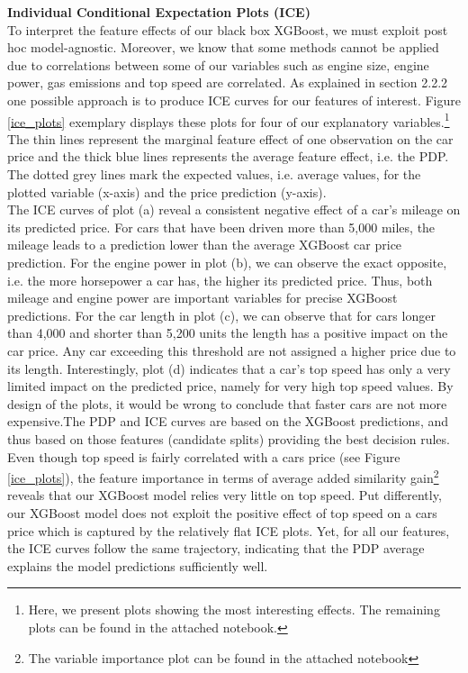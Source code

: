 \documentclass[12pt]{article}
\begin{document}
\noindent \textbf{Individual Conditional Expectation Plots (ICE)} \\
To interpret the feature effects of our black box XGBoost, we must exploit post hoc model-agnostic. Moreover, we know that some methods cannot be applied due to correlations between some of our variables such as engine size, engine power, gas emissions and top speed are correlated. As explained in section 2.2.2 one possible approach is to produce ICE curves for our features of interest. Figure \ref{ice_plots} exemplary displays these plots for four of our explanatory variables.\footnote{Here, we present plots showing the most interesting effects. The remaining plots can be found in the attached notebook.} The thin lines represent the marginal feature effect of one observation on the car price and the thick blue lines represents the average feature effect, i.e. the PDP. The dotted grey lines mark the expected values, i.e.  average values, for the plotted variable (x-axis) and the price prediction (y-axis).\\

\noindent The ICE curves of plot (a) reveal a consistent negative effect of a car's mileage on its predicted price. For cars that have been driven more than 5,000 miles, the mileage leads to a prediction lower than the average XGBoost car price prediction. For the engine power in plot (b), we can observe the exact opposite, i.e. the more horsepower a car has, the higher its predicted price. Thus, both mileage and engine power are important variables for precise XGBoost predictions. For the car length in plot (c), we can observe that for cars longer than 4,000 and shorter than 5,200 units the length has a positive impact on the car price. Any car exceeding this threshold are not assigned a higher price due to its length. Interestingly, plot (d) indicates that a car's top speed has only a very limited impact on the predicted price, namely for very high top speed values. By design of the plots, it would be wrong to conclude that faster cars are not more expensive.The PDP and ICE curves are based on the XGBoost predictions, and thus based on those features (candidate splits) providing the best decision rules. Even though top speed is fairly correlated with a cars price (see Figure \ref{ice_plots}), the feature importance in terms of average added similarity gain\footnote{The variable importance plot can be found in the attached notebook} reveals that our XGBoost model relies very little on top speed. Put differently, our XGBoost model does not exploit the positive effect of top speed on a cars price which is captured by the relatively flat ICE plots. Yet, for all our features, the ICE curves follow the same trajectory, indicating that the PDP average explains the model predictions sufficiently well. \\
\end{document}
